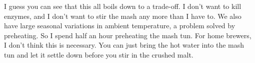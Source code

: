 \documentclass[letterpaper,12pt]{article}
\begin{document}
I guess you can see that this all boils down to a trade-off. I don't want to kill enzymes, and I don't want to stir the mash any more than I have to. We also have large seasonal variations in ambient temperature, a problem solved by preheating. So I spend half an hour preheating the mash tun. For home brewers, I don't think this is necessary. You can just bring the hot water into the mash tun and let it settle down before you stir in the crushed malt.
\end{document}
